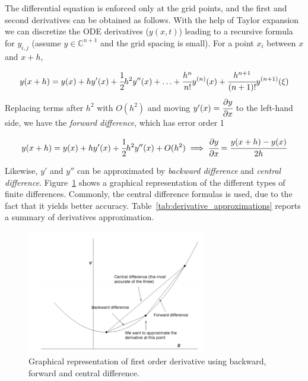 The differential equation is enforced only at the grid points, and the first and second derivatives can be obtained as follows.
With the help of Taylor expansion we can discretize the ODE  derivatives ($y(x, t)$) leading to a recursive formula for $y_{i,j}$ (assume $y\in\mathbb{C}^{n+1}$ and the grid spacing is small). For a point $x_i$ between $x$ and $x+h$,

\begin{equation}
y(x+h)=y(x)+hy'(x)+\cfrac{1}{2}h^2y''(x)+\ldots+\cfrac{h^n}{n!}y^{(n)}(x)+\cfrac{h^{n+1}}{(n+1)!}y^{(n+1)}(\xi)
\end{equation}
Replacing terms after $h^2$ with $O(h^2)$ and moving $y'(x)=\cfrac{\partial y}{\partial x}$ to the left-hand side, we have the \emph{forward difference}, which has error order 1

\begin{equation}
y(x+h)=y(x)+hy'(x)+\cfrac{1}{2}h^2y''(x)+O(h^2)
\implies \cfrac{\partial y}{\partial x} = \cfrac{y(x+h)-y(x)}{2h}
\end{equation}

Likewise, $y'$ and $y''$ can be approximated by \emph{backward difference} and \emph{central difference}. Figure~\ref{fig:graph_finite_difference} shows a graphical representation of the different types of finite differences. Commonly, the central difference formulas is used, due to the fact that it yields better accuracy. 
Table~\ref{tab:derivative_approximations} reports a summary of derivatives approximation.

\begin{figure}[htb]
	\centering
	\includegraphics[width=0.7\textwidth]{figures/graph_finite_difference}
	\caption{Graphical representation of first order derivative using backward, forward and central difference.}
	\label{fig:graph_finite_difference}
\end{figure} 
 

